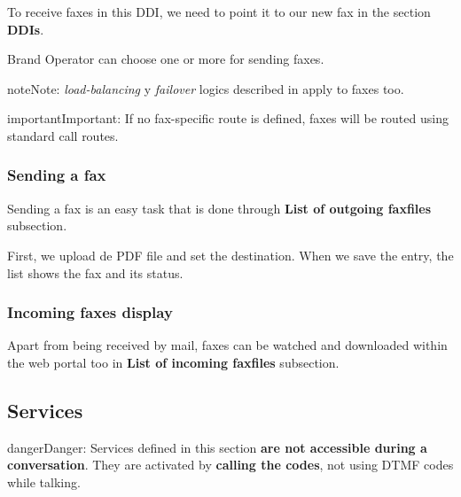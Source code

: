 \documentclass[letterpaper,10pt,english]{sphinxmanual}
\begin{document}
To receive faxes in this DDI, we need to point it to our new fax in the section
\textbf{DDIs}.

Brand Operator can choose one or more {\hyperref[administration_portal/brand/routing/outgoing_routings:outgoing\string-routings]{}} for sending faxes.

\begin{notice}{note}{Note:}
\emph{load-balancing} y \emph{failover} logics described in {\hyperref[administration_portal/brand/routing/outgoing_routings:outgoing\string-routings]{}}
apply to faxes too.
\end{notice}

\begin{notice}{important}{Important:}
If no fax-specific route is defined, faxes will be routed using
standard call routes.
\end{notice}


\subsubsection{Sending a fax}
\label{administration_portal/client/vpbx/faxes:sending-a-fax}
Sending a fax is an easy task that is done through \textbf{List of outgoing faxfiles} subsection.

First, we upload de PDF file and set the destination. When we save the entry, the list shows the fax and its status.


\subsubsection{Incoming faxes display}
\label{administration_portal/client/vpbx/faxes:incoming-faxes-display}
Apart from being received by mail, faxes can be watched and downloaded within
the web portal too in \textbf{List of incoming faxfiles} subsection.
\label{administration_portal/client/vpbx/services:client-services}

\subsection{Services}
\label{administration_portal/client/vpbx/services:services}\label{administration_portal/client/vpbx/services:client-services}\label{administration_portal/client/vpbx/services::doc}\label{administration_portal/client/vpbx/services:id1}
\begin{notice}{danger}{Danger:}
Services defined in this section \textbf{are not accessible during a
conversation}. They are activated by \textbf{calling the codes}, not using
DTMF codes while talking.
\end{notice}
\end{document}
